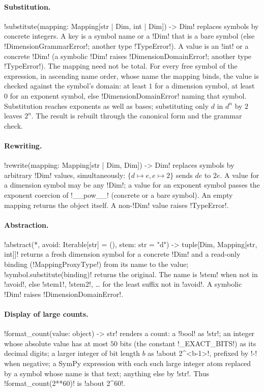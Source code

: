 \paragraph{Substitution.} \py!substitute(mapping: Mapping[str | Dim, int | Dim]) -> Dim! replaces symbols by concrete integers. A key is a symbol name or a \py!Dim! that is a bare symbol (else \py!DimensionGrammarError!; another type \py!TypeError!). A value is an \py!int! or a concrete \py!Dim! (a symbolic \py!Dim! raises \py!DimensionDomainError!; another type \py!TypeError!). The mapping need not be total. For every free symbol of the expression, in ascending name order, whose name the mapping binds, the value is checked against the symbol's domain: at least $1$ for a dimension symbol, at least $0$ for an exponent symbol, else \py!DimensionDomainError! naming that symbol. Substitution reaches exponents as well as bases; substituting only $d$ in $d^n$ by $2$ leaves $2^n$. The result is rebuilt through the canonical form and the grammar check.

\paragraph{Rewriting.} \py!rewrite(mapping: Mapping[str | Dim, Dim]) -> Dim! replaces symbols by arbitrary \py!Dim! values, simultaneously: $\{d\mapsto e,e\mapsto 2\}$ sends $de$ to $2e$. A value for a dimension symbol may be any \py!Dim!; a value for an exponent symbol passes the exponent coercion of \py!__pow__! (concrete or a bare symbol). An empty mapping returns the object itself. A non-\py!Dim! value raises \py!TypeError!.

\paragraph{Abstraction.} \py!abstract(*, avoid: Iterable[str] = (), stem: str = "d") -> tuple[Dim, Mapping[str, int]]! returns a fresh dimension symbol for a concrete \py!Dim! and a read-only binding (\py!MappingProxyType!) from its name to the value; \py!symbol.substitute(binding)! returns the original. The name is \code!stem! when not in \code!avoid!, else \code!stem1!, \code!stem2!, \ldots{} for the least suffix not in \code!avoid!. A symbolic \py!Dim! raises \py!DimensionDomainError!.

\paragraph{Display of large counts.} \py!format_count(value: object) -> str! renders a count: a \py!bool! as \py!str!; an integer whose absolute value has at most $50$ bits (the constant \py!_EXACT_BITS!) as its decimal digits; a larger integer of bit length $b$ as \code!about 2^<b-1>!, prefixed by \code!-! when negative; a SymPy expression with each such large integer atom replaced by a symbol whose name is that text; anything else by \py!str!. Thus \py!format_count(2**60)! is \code!about 2^60!.

